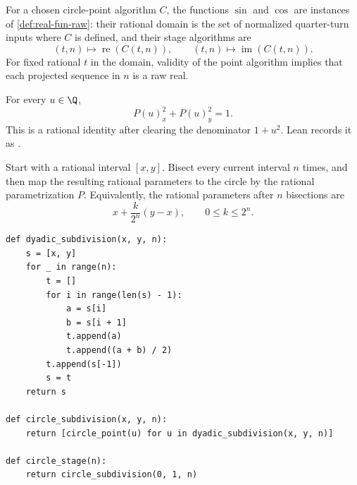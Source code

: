\begin{remark}
\label{rem:sin-cos-function-instance}
For a chosen circle-point algorithm \(C\), the functions \(\sin\) and \(\cos\)
are instances of \cref{def:real-fun-raw}: their rational domain is the set of
normalized quarter-turn inputs where \(C\) is defined, and their stage
algorithms are
\[
  (t,n)\longmapsto \operatorname{re}(C(t,n)),
  \qquad
  (t,n)\longmapsto \operatorname{im}(C(t,n)).
\]
For fixed rational \(t\) in the domain, validity of the point algorithm implies
that each projected sequence in \(n\) is a raw real.
\end{remark}

\begin{remark}
\label{rem:rational-circle-equation}
For every \(u\in\Q\),
\[
  P(u)_x^2+P(u)_y^2=1.
\]
This is a rational identity after clearing the denominator \(1+u^2\).  Lean
records it as .
\end{remark}

\begin{remark}
\label{rem:dyadic-rational-circle-stages}
Start with a rational interval \([x,y]\).  Bisect every current interval
\(n\) times, and then map the resulting rational parameters to the circle by
the rational parametrization \(P\).  Equivalently, the rational parameters
after \(n\) bisections are
\[
  x+\frac{k}{2^n}(y-x),
  \qquad 0\le k\le 2^n.
\]
\begin{verbatim}
def dyadic_subdivision(x, y, n):
    s = [x, y]
    for _ in range(n):
        t = []
        for i in range(len(s) - 1):
            a = s[i]
            b = s[i + 1]
            t.append(a)
            t.append((a + b) / 2)
        t.append(s[-1])
        s = t
    return s

def circle_subdivision(x, y, n):
    return [circle_point(u) for u in dyadic_subdivision(x, y, n)]

def circle_stage(n):
    return circle_subdivision(0, 1, n)
\end{verbatim}
\end{remark}

